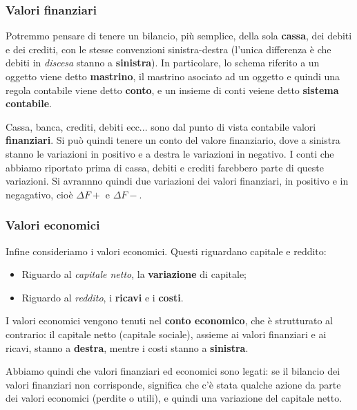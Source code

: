 \documentclass[a4paper,11pt]{article}
\begin{document}
\subsubsection{Valori finanziari}
Potremmo pensare di tenere un bilancio, più semplice, della sola \textbf{cassa}, dei debiti e dei crediti, con le stesse convenzioni sinistra-destra (l'unica differenza è che debiti in \textit{discesa} stanno a \textbf{sinistra}).
In particolare, lo schema riferito a un oggetto viene detto \textbf{mastrino}, il mastrino asociato ad un oggetto e quindi una regola contabile viene detto \textbf{conto}, e un insieme di conti veiene detto \textbf{sistema contabile}.

Cassa, banca, crediti, debiti ecc... sono dal punto di vista contabile valori \textbf{finanziari}.
Si può quindi tenere un conto del valore finanziario, dove a sinistra stanno le variazioni in positivo e a destra le variazioni in negativo.
I conti che abbiamo riportato prima di cassa, debiti e crediti farebbero parte di queste variazioni.
Si avrannno quindi due variazioni dei valori finanziari, in positivo e in negagativo, cioè $\Delta F+$ e $\Delta F-$.

\subsubsection{Valori economici}
Infine consideriamo i valori economici.
Questi riguardano capitale e reddito:
\begin{itemize}
	\item Riguardo al \textit{capitale netto}, la \textbf{variazione} di capitale;
	\item Riguardo al \textit{reddito}, i \textbf{ricavi} e i \textbf{costi}.
\end{itemize}

I valori economici vengono tenuti nel \textbf{conto economico}, che è strutturato al contrario: il capitale netto (capitale sociale), assieme ai valori finanziari e ai ricavi, stanno a \textbf{destra}, mentre i costi stanno a \textbf{sinistra}.

\par\medskip

Abbiamo quindi che valori finanziari ed economici sono legati: se il bilancio dei valori finanziari non corrisponde, significa che c'è stata qualche azione da parte dei valori economici (perdite o utili), e quindi una variazione del capitale netto.
\end{document}
